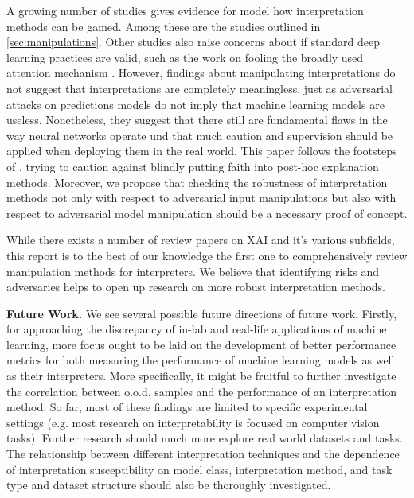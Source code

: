 \documentclass[sigconf]{acmart}
\newcommand{\mypar}[1]{\vspace{0.2cm}\noindent\textbf{#1}}
\begin{document}
A growing number of studies gives evidence for model how interpretation methods can be gamed. Among these are the studies outlined in \autoref{sec:manipulations}. Other studies also raise concerns about if standard deep learning practices are valid, such as the work on fooling the broadly used attention mechanism \cite{jain2019attention}.
However, findings about manipulating interpretations do not suggest that interpretations are completely meaningless, just as adversarial attacks on predictions models do not imply that machine learning models are useless. Nonetheless, they suggest that there still are fundamental flaws in the way neural networks operate und that much caution and supervision should be applied when deploying them in the real world. 
This paper follows the footsteps of \cite{lipton2018mythos}, trying to caution against blindly putting faith into post-hoc explanation methods. Moreover, we propose that checking the robustness of interpretation methods not only with respect to adversarial input manipulations but also with respect to adversarial model manipulation should be a necessary proof of concept. 

While there exists a number of review papers on XAI and it's various subfields, this report is to the best of our knowledge the first one to comprehensively review manipulation methods for interpreters. 
We believe that identifying risks and adversaries helps to open up research on more robust interpretation methods. 


\mypar{Future Work.} \newline
We see several possible future directions of future work. Firstly, for approaching the discrepancy of in-lab and real-life applications of machine learning, more focus ought to be laid on the development of better performance metrics for both measuring the performance of machine learning models as well as their interpreters. 
More specifically, it might be fruitful to further investigate the correlation between o.o.d. samples and the performance of an interpretation method. So far, most of these findings are limited to specific experimental settings (e.g. most research on interpretability is focused on computer vision tasks).
Further research should much more explore real world datasets and tasks. The relationship between different interpretation techniques and the dependence of interpretation susceptibility on model class, interpretation method, and task type and dataset structure should also be thoroughly investigated. 

{}
% 

\end{document}
